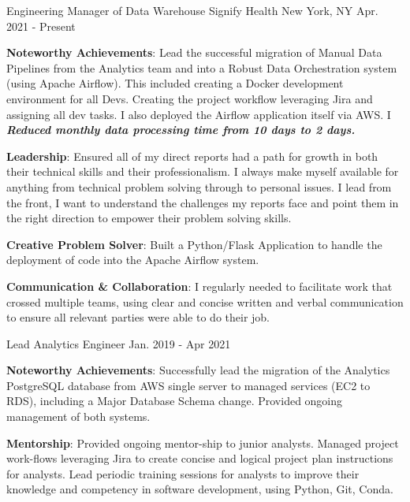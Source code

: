 \begin{cventries}
  \cventry
    {Engineering Manager of Data Warehouse}
    {Signify Health}
    {New York, NY}
    {Apr. 2021 - Present}
    {
      \begin{cvitems}
           \item {\textbf{Noteworthy Achievements}: Lead the successful migration of Manual Data Pipelines from the Analytics team and into a Robust Data Orchestration system (using Apache Airflow). This included creating a Docker development environment for all Devs. Creating the project workflow leveraging Jira and assigning all dev tasks. I also deployed the Airflow application itself via AWS. I \textbf{\emph{Reduced monthly data processing time from 10 days to 2 days.}}
          \item {\textbf{Leadership}: Ensured all of my direct reports had a path for growth in both their technical skills and their professionalism. I always make myself available for anything from technical problem solving through to personal issues. I lead from the front, I want to understand the challenges my reports face and point them in the right direction to empower their problem solving skills.}
          \item {\textbf{Creative Problem Solver}: Built a Python/Flask Application to handle the deployment of code into the Apache Airflow system.}
          \item {\textbf{Communication \& Collaboration}}: I regularly needed to facilitate work that crossed multiple teams, using clear and concise written and verbal communication to ensure all relevant parties were able to do their job.}
      \end{cvitems}
    }
  \cventry
    {Lead Analytics Engineer}
    {}
    {}
    {Jan. 2019 - Apr 2021}
    {
      \begin{cvitems}
          \item {\textbf{Noteworthy Achievements}: Successfully lead the migration of the Analytics PostgreSQL database from AWS single server to managed services (EC2 to RDS), including a Major Database Schema change. Provided ongoing management of both systems.}
          \item {\textbf{Mentorship}: Provided ongoing mentor-ship to junior analysts. Managed project work-flows leveraging Jira to create concise and logical project plan instructions for analysts. Lead periodic training sessions for analysts to improve their knowledge and competency in software development, using Python, Git, Conda.}

\end{cvitems}}
\end{cventries}
